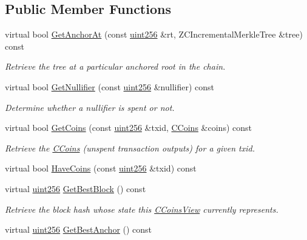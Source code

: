 \subsection*{Public Member Functions}
\begin{DoxyCompactItemize}
\item 
virtual bool \mbox{\hyperlink{class_c_coins_view_a2fcf3f99111eef1c41243f54f94d3be8}{Get\+Anchor\+At}} (const \mbox{\hyperlink{classuint256}{uint256}} \&rt, Z\+C\+Incremental\+Merkle\+Tree \&tree) const
\begin{DoxyCompactList}\small\item\em Retrieve the tree at a particular anchored root in the chain. \end{DoxyCompactList}\item 
virtual bool \mbox{\hyperlink{class_c_coins_view_a45a7abe02d0d9d1b61a09dec70a3311f}{Get\+Nullifier}} (const \mbox{\hyperlink{classuint256}{uint256}} \&nullifier) const
\begin{DoxyCompactList}\small\item\em Determine whether a nullifier is spent or not. \end{DoxyCompactList}\item 
virtual bool \mbox{\hyperlink{class_c_coins_view_a67d865358127bef1f0011a23d5158a9f}{Get\+Coins}} (const \mbox{\hyperlink{classuint256}{uint256}} \&txid, \mbox{\hyperlink{class_c_coins}{C\+Coins}} \&coins) const
\begin{DoxyCompactList}\small\item\em Retrieve the \mbox{\hyperlink{class_c_coins}{C\+Coins}} (unspent transaction outputs) for a given txid. \end{DoxyCompactList}\item 
virtual bool \mbox{\hyperlink{class_c_coins_view_ade3a65fc3f1b02baf7bebce630e4eba3}{Have\+Coins}} (const \mbox{\hyperlink{classuint256}{uint256}} \&txid) const
\item 
virtual \mbox{\hyperlink{classuint256}{uint256}} \mbox{\hyperlink{class_c_coins_view_af81f2907d360a2548d59a61388e5e5cb}{Get\+Best\+Block}} () const
\begin{DoxyCompactList}\small\item\em Retrieve the block hash whose state this \mbox{\hyperlink{class_c_coins_view}{C\+Coins\+View}} currently represents. \end{DoxyCompactList}\item 
virtual \mbox{\hyperlink{classuint256}{uint256}} \mbox{\hyperlink{class_c_coins_view_a4d51ab1de57e76a174b5ca874c601b52}{Get\+Best\+Anchor}} () const

\end{DoxyCompactItemize}
